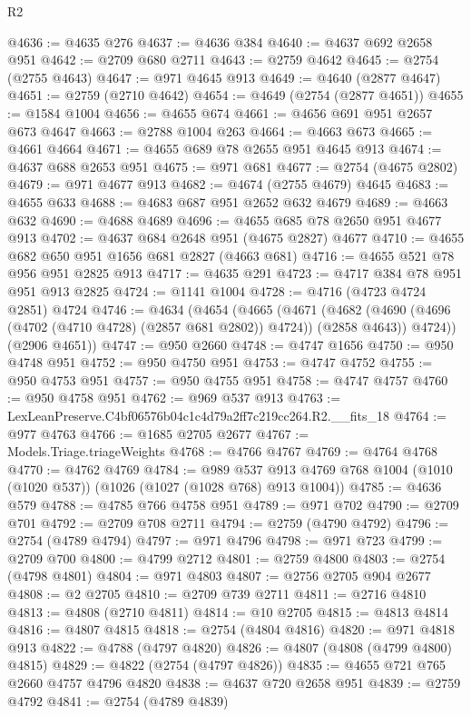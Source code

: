 \begin{lexlean}{R2}
\begin{coremodule}
@4636 := @4635 @276
@4637 := @4636 @384
@4640 := @4637 @692 @2658 @951
@4642 := @2709 @680 @2711
@4643 := @2759 @4642
@4645 := @2754 (@2755 @4643)
@4647 := @971 @4645 @913
@4649 := @4640 (@2877 @4647)
@4651 := @2759 (@2710 @4642)
@4654 := @4649 (@2754 (@2877 @4651))
@4655 := @1584 @1004
@4656 := @4655 @674
@4661 := @4656 @691 @951 @2657 @673 @4647
@4663 := @2788 @1004 @263
@4664 := @4663 @673
@4665 := @4661 @4664
@4671 := @4655 @689 @78 @2655 @951 @4645 @913
@4674 := @4637 @688 @2653 @951
@4675 := @971 @681
@4677 := @2754 (@4675 @2802)
@4679 := @971 @4677 @913
@4682 := @4674 (@2755 @4679) @4645
@4683 := @4655 @633
@4688 := @4683 @687 @951 @2652 @632 @4679
@4689 := @4663 @632
@4690 := @4688 @4689
@4696 := @4655 @685 @78 @2650 @951 @4677 @913
@4702 := @4637 @684 @2648 @951 (@4675 @2827) @4677
@4710 := @4655 @682 @650 @951 @1656 @681 @2827 (@4663 @681)
@4716 := @4655 @521 @78 @956 @951 @2825 @913
@4717 := @4635 @291
@4723 := @4717 @384 @78 @951 @951 @913 @2825
@4724 := @1141 @1004
@4728 := @4716 (@4723 @4724 @2851) @4724
@4746 := @4634
    (@4654
      (@4665
        (@4671
          (@4682 (@4690 (@4696 (@4702 (@4710 @4728) (@2857 @681 @2802)) @4724)) (@2858 @4643))
          @4724))
      (@2906 @4651))
@4747 := @950 @2660
@4748 := @4747 @1656
@4750 := @950 @4748 @951
@4752 := @950 @4750 @951
@4753 := @4747 @4752
@4755 := @950 @4753 @951
@4757 := @950 @4755 @951
@4758 := @4747 @4757
@4760 := @950 @4758 @951
@4762 := @969 @537 @913
@4763 := LexLeanPreserve.C4bf06576b04c1c4d79a2ff7c219cc264.R2.__fits_18
@4764 := @977 @4763
@4766 := @1685 @2705 @2677
@4767 := Models.Triage.triageWeights
@4768 := @4766 @4767
@4769 := @4764 @4768
@4770 := @4762 @4769
@4784 := @989
    @537
    @913
    @4769
    @768
    @1004
    (@1010 (@1020 @537))
    (@1026 (@1027 (@1028 @768) @913 @1004))
@4785 := @4636 @579
@4788 := @4785 @766 @4758 @951
@4789 := @971 @702
@4790 := @2709 @701
@4792 := @2709 @708 @2711
@4794 := @2759 (@4790 @4792)
@4796 := @2754 (@4789 @4794)
@4797 := @971 @4796
@4798 := @971 @723
@4799 := @2709 @700
@4800 := @4799 @2712
@4801 := @2759 @4800
@4803 := @2754 (@4798 @4801)
@4804 := @971 @4803
@4807 := @2756 @2705 @904 @2677
@4808 := @2 @2705
@4810 := @2709 @739 @2711
@4811 := @2716 @4810
@4813 := @4808 (@2710 @4811)
@4814 := @10 @2705
@4815 := @4813 @4814
@4816 := @4807 @4815
@4818 := @2754 (@4804 @4816)
@4820 := @971 @4818 @913
@4822 := @4788 (@4797 @4820)
@4826 := @4807 (@4808 (@4799 @4800) @4815)
@4829 := @4822 (@2754 (@4797 @4826))
@4835 := @4655 @721 @765 @2660 @4757 @4796 @4820
@4838 := @4637 @720 @2658 @951
@4839 := @2759 @4792
@4841 := @2754 (@4789 @4839)

\end{coremodule}
\end{lexlean}
